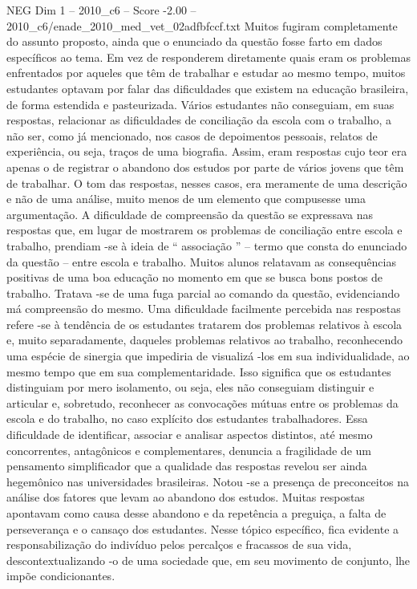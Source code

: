 \begin{textsample}{NEG Dim 1 – 2010\_c6 – Score -2.00 – 2010\_c6/enade\_2010\_med\_vet\_02adfbfccf.txt}
Muitos fugiram completamente do assunto proposto, ainda que o enunciado da questão fosse farto em dados específicos ao tema.
Em vez de responderem diretamente quais eram os problemas enfrentados por aqueles que têm de trabalhar e estudar ao mesmo tempo, muitos estudantes optavam por falar das dificuldades que existem na educação brasileira, de forma estendida e pasteurizada.
Vários estudantes não conseguiam, em suas respostas, relacionar as dificuldades de conciliação da escola com o trabalho, a não ser, como já mencionado, nos casos de depoimentos pessoais, relatos de experiência, ou seja, traços de uma biografia.
Assim, eram respostas cujo teor era apenas o de registrar o abandono dos estudos por parte de vários jovens que têm de trabalhar.
O tom das respostas, nesses casos, era meramente de uma descrição e não de uma análise, muito menos de um elemento que compusesse uma argumentação.
A dificuldade de compreensão da questão se expressava nas respostas que, em lugar de mostrarem os problemas de conciliação entre escola e trabalho, prendiam -se à ideia de “ associação ” – termo que consta do enunciado da questão – entre escola e trabalho.
Muitos alunos relatavam as consequências positivas de uma boa educação no momento em que se busca bons postos de trabalho.
Tratava -se de uma fuga parcial ao comando da questão, evidenciando má compreensão do mesmo.
Uma dificuldade facilmente percebida nas respostas refere -se à tendência de os estudantes tratarem dos problemas relativos à escola e, muito separadamente, daqueles problemas relativos ao trabalho, reconhecendo uma espécie de sinergia que impediria de visualizá -los em sua individualidade, ao mesmo tempo que em sua complementaridade.
Isso significa que os estudantes distinguiam por mero isolamento, ou seja, eles não conseguiam distinguir e articular e, sobretudo, reconhecer as convocações mútuas entre os problemas da escola e do trabalho, no caso explícito dos estudantes trabalhadores.
Essa dificuldade de identificar, associar e analisar aspectos distintos, até mesmo concorrentes, antagônicos e complementares, denuncia a fragilidade de um pensamento simplificador que a qualidade das respostas revelou ser ainda hegemônico nas universidades brasileiras.
Notou -se a presença de preconceitos na análise dos fatores que levam ao abandono dos estudos.
Muitas respostas apontavam como causa desse abandono e da repetência a preguiça, a falta de perseverança e o cansaço dos estudantes.
Nesse tópico específico, fica evidente a responsabilização do indivíduo pelos percalços e fracassos de sua vida, descontextualizando -o de uma sociedade que, em seu movimento de conjunto, lhe impõe condicionantes.

\end{textsample}
